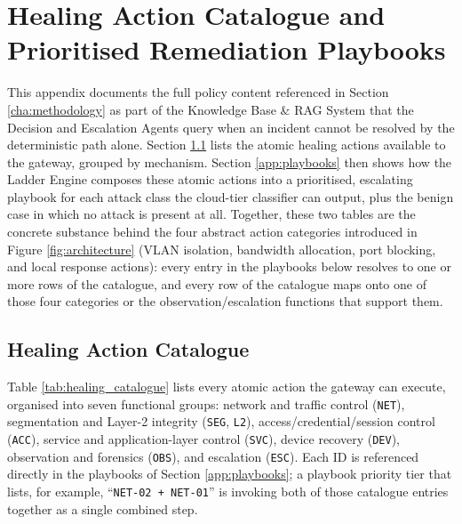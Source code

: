 \chapter{Healing Action Catalogue and Prioritised Remediation Playbooks}\label{app:healing_actions}

This appendix documents the full policy content referenced in Section \ref{cha:methodology} as part of the Knowledge Base \& RAG System that the Decision and Escalation Agents query when an incident cannot be resolved by the deterministic path alone. Section \ref{app:catalogue} lists the atomic healing actions available to the gateway, grouped by mechanism. Section \ref{app:playbooks} then shows how the Ladder Engine composes these atomic actions into a prioritised, escalating playbook for each attack class the cloud-tier classifier can output, plus the benign case in which no attack is present at all. Together, these two tables are the concrete substance behind the four abstract action categories introduced in Figure \ref{fig:architecture} (VLAN isolation, bandwidth allocation, port blocking, and local response actions): every entry in the playbooks below resolves to one or more rows of the catalogue, and every row of the catalogue maps onto one of those four categories or the observation/escalation functions that support them.

\section{Healing Action Catalogue}\label{app:catalogue}

Table \ref{tab:healing_catalogue} lists every atomic action the gateway can execute, organised into seven functional groups: network and traffic control (\texttt{NET}), segmentation and Layer-2 integrity (\texttt{SEG}, \texttt{L2}), access/credential/session control (\texttt{ACC}), service and application-layer control (\texttt{SVC}), device recovery (\texttt{DEV}), observation and forensics (\texttt{OBS}), and escalation (\texttt{ESC}). Each ID is referenced directly in the playbooks of Section \ref{app:playbooks}; a playbook priority tier that lists, for example, ``\texttt{NET-02 + NET-01}'' is invoking both of those catalogue entries together as a single combined step.

